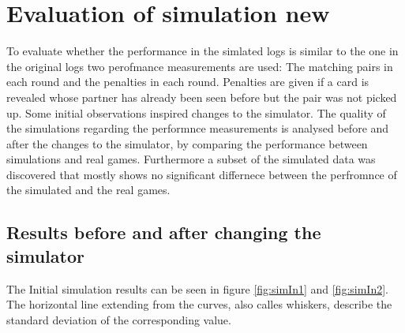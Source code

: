 \section{Evaluation of simulation new}
To evaluate whether the performance in the simlated logs is similar to the one in the original logs two perofmance measurements are used: The matching pairs in each round and the penalties in each round. Penalties are given if a card is revealed whose partner has already been seen before but the pair was not picked up. Some initial observations inspired changes to the simulator. The quality of the simulations regarding the performnce measurements is analysed before and after the changes to the simulator, by comparing the performance between simulations and real games. Furthermore a subset of the simulated data was discovered that mostly shows no significant differnece between the perfromnce of the simulated and the real games.

\subsection{Results before and after changing the simulator}
The Initial simulation results can be seen in figure \ref{fig:simIn1} and \ref{fig:simIn2}. The horizontal line extending from the curves, also calles whiskers, describe the standard deviation of the corresponding value. 

